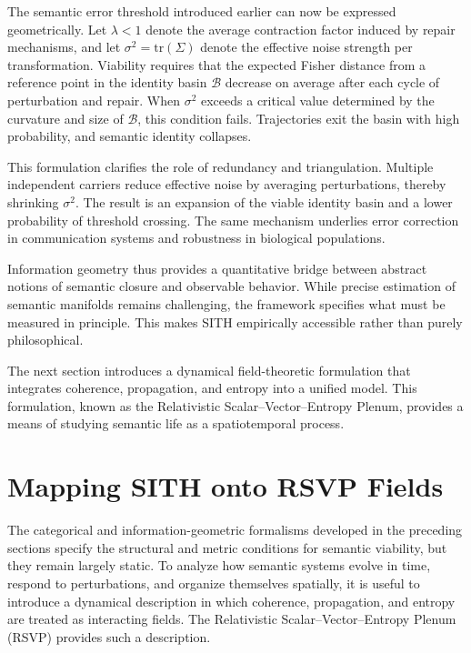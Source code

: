 \documentclass[11pt,oneside]{article}
\begin{document}
The semantic error threshold introduced earlier can now be expressed geometrically. Let $\lambda < 1$ denote the average contraction factor induced by repair mechanisms, and let $\sigma^2 = \mathrm{tr}(\Sigma)$ denote the effective noise strength per transformation. Viability requires that the expected Fisher distance from a reference point in the identity basin $\mathcal{B}$ decrease on average after each cycle of perturbation and repair. When $\sigma^2$ exceeds a critical value determined by the curvature and size of $\mathcal{B}$, this condition fails. Trajectories exit the basin with high probability, and semantic identity collapses.

This formulation clarifies the role of redundancy and triangulation. Multiple independent carriers reduce effective noise by averaging perturbations, thereby shrinking $\sigma^2$. The result is an expansion of the viable identity basin and a lower probability of threshold crossing. The same mechanism underlies error correction in communication systems and robustness in biological populations.


Information geometry thus provides a quantitative bridge between abstract notions of semantic closure and observable behavior. While precise estimation of semantic manifolds remains challenging, the framework specifies what must be measured in principle. This makes SITH empirically accessible rather than purely philosophical.

The next section introduces a dynamical field-theoretic formulation that integrates coherence, propagation, and entropy into a unified model. This formulation, known as the Relativistic Scalar–Vector–Entropy Plenum, provides a means of studying semantic life as a spatiotemporal process.

\section{Mapping SITH onto RSVP Fields}

The categorical and information-geometric formalisms developed in the preceding sections specify the structural and metric conditions for semantic viability, but they remain largely static. To analyze how semantic systems evolve in time, respond to perturbations, and organize themselves spatially, it is useful to introduce a dynamical description in which coherence, propagation, and entropy are treated as interacting fields. The Relativistic Scalar–Vector–Entropy Plenum (RSVP) provides such a description.
\end{document}
